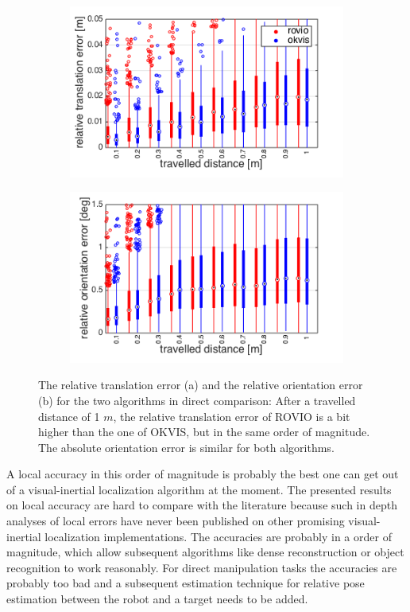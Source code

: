 \begin{figure}[h]
  \begin{subfigure}[b]{0.48\textwidth}
    \includegraphics[width=\textwidth]{images/ijrr/rte.png}
    \caption{}
    \label{fig:2}
  \end{subfigure}
  \hfill
  \begin{subfigure}[b]{0.48\textwidth}
    \includegraphics[width=\textwidth]{images/ijrr/roe.png}
    \caption{}
    \label{fig:2}
  \end{subfigure}
   \caption{The relative translation error (a) and the relative orientation error (b) for the two algorithms in direct comparison: After a travelled distance of 1 $m$, the relative translation error of ROVIO is a bit higher than the one of OKVIS, but in the same order of magnitude. The absolute orientation error is similar for both algorithms.}
   \label{pics:ijrr_rel}
\end{figure}

A local accuracy in this order of magnitude is probably the best one can get out of a visual-inertial localization algorithm at the moment. The presented results on local accuracy are hard to compare with the literature because such in depth analyses of local errors have never been published on other promising visual-inertial localization implementations. The accuracies are probably in a order of magnitude, which allow subsequent algorithms like dense reconstruction or object recognition to work reasonably. For direct manipulation tasks the accuracies are probably too bad and a subsequent estimation technique for relative pose estimation between the robot and a target needs to be added.


